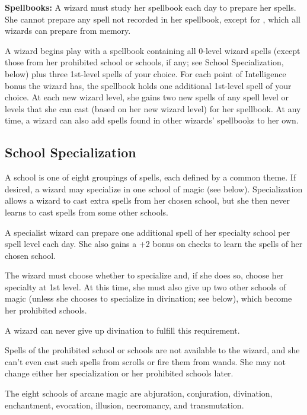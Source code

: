 \textbf{Spellbooks:} A wizard must study her spellbook each day to prepare her spells. She cannot prepare any spell not recorded in her spellbook, except for , which all wizards can prepare from memory.

A wizard begins play with a spellbook containing all 0-level wizard spells (except those from her prohibited school or schools, if any; see School Specialization, below) plus three 1st-level spells of your choice. For each point of Intelligence bonus the wizard has, the spellbook holds one additional 1st-level spell of your choice. At each new wizard level, she gains two new spells of any spell level or levels that she can cast (based on her new wizard level) for her spellbook. At any time, a wizard can also add spells found in other wizards' spellbooks to her own.

\subsection{School Specialization}

A school is one of eight groupings of spells, each defined by a common theme. If desired, a wizard may specialize in one school of magic (see below). Specialization allows a wizard to cast extra spells from her chosen school, but she then never learns to cast spells from some other schools.

A specialist wizard can prepare one additional spell of her specialty school per spell level each day. She also gains a +2 bonus on  checks to learn the spells of her chosen school.

The wizard must choose whether to specialize and, if she does so, choose her specialty at 1st level. At this time, she must also give up two other schools of magic (unless she chooses to specialize in divination; see below), which become her prohibited schools.

A wizard can never give up divination to fulfill this requirement.

Spells of the prohibited school or schools are not available to the wizard, and she can't even cast such spells from scrolls or fire them from wands. She may not change either her specialization or her prohibited schools later.

The eight schools of arcane magic are abjuration, conjuration, divination, enchantment, evocation, illusion, necromancy, and transmutation.

